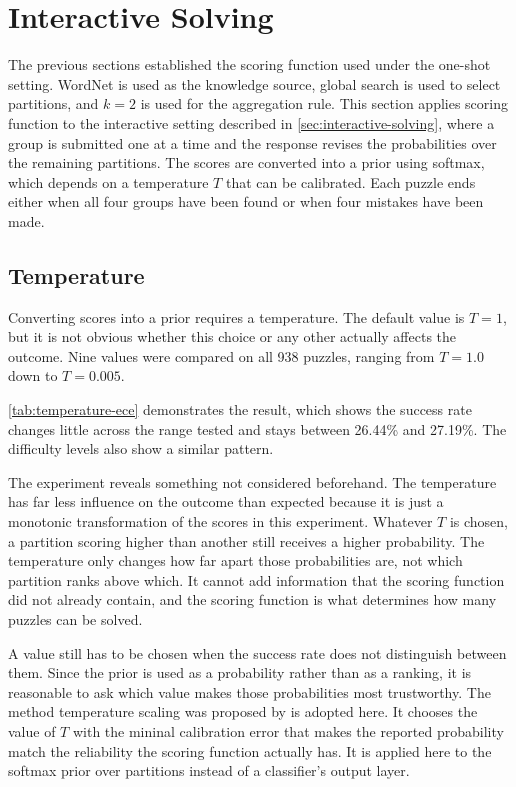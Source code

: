 \section{Interactive Solving}
\label{sec:exp-interactive}
The previous sections established the scoring function used under the one-shot setting. WordNet is used as the knowledge source, global search is used to select partitions, and $k = 2$ is used for the aggregation rule. This section applies scoring function to the interactive setting described in \autoref{sec:interactive-solving}, where a group is submitted one at a time and the response revises the probabilities over the remaining partitions. The scores are converted into a prior using softmax, which depends on a temperature $T$ that can be calibrated. Each puzzle ends either when all four groups have been found or when four mistakes have been made.

\subsection{Temperature}
\label{sec:exp-temperature}

Converting scores into a prior requires a temperature. The default value is $T = 1$, but it is not obvious whether this choice or any other actually affects the outcome. Nine values were compared on all 938 puzzles, ranging from $T = 1.0$ down to $T = 0.005$.

\autoref{tab:temperature-ece} demonstrates the result, which shows the success rate changes little across the range tested and stays between 26.44\% and 27.19\%. The difficulty levels also show a similar pattern.

The experiment reveals something not considered beforehand. The temperature has far less influence on the outcome than expected because it is just a monotonic transformation of the scores in this experiment. Whatever $T$ is chosen, a partition scoring higher than another still receives a higher probability. The temperature only changes how far apart those probabilities are, not which partition ranks above which. It cannot add information that the scoring function did not already contain, and the scoring function is what determines how many puzzles can be solved.

A value still has to be chosen when the success rate does not distinguish between them. Since the prior is used as a probability rather than as a ranking, it is reasonable to ask which value makes those probabilities most trustworthy. The method temperature scaling was proposed by \citeauthor{guoCalibrationModernNeural2017} \cite{guoCalibrationModernNeural2017} is adopted here. It chooses the value of $T$ with the mininal calibration error that makes the reported probability match the reliability the scoring function actually has. It is applied here to the softmax prior over partitions instead of a classifier's output layer.

